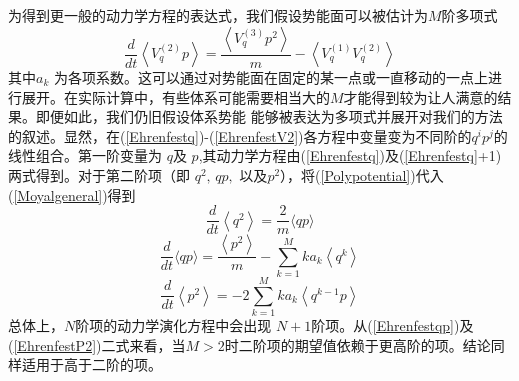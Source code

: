 为得到更一般的动力学方程的表达式，我们假设势能面可以被估计为$M$阶多项式
\begin{equation}
	\frac{d}{d t}\left\langle V_{q}^{(2)} p\right\rangle=\frac{\left\langle V_{q}^{(3)} p^{2}\right\rangle}{m}-\left\langle V_{q}^{(1)} V_{q}^{(2)}\right\rangle
\label{Polypotential} 
\end{equation}
其中$a_k$ 为各项系数。这可以通过对势能面在固定的某一点或一直移动的一点上进行展开。在实际计算中，有些体系可能需要相当大的$M$才能得到较为让人满意的结果。即便如此，我们仍旧假设体系势能 能够被表达为多项式并展开对我们的方法的叙述。显然，在(\ref{Ehrenfestq})-(\ref{EhrenfestV2})各方程中变量变为不同阶的$q^ip^j$的线性组合。第一阶变量为 $q$及 $p$,其动力学方程由(\ref{Ehrenfestq})及(\ref{Ehrenfestq}+1)两式得到。对于第二阶项（即 $q^2,\,qp,$ 以及$p^2$），将(\ref{Polypotential})代入(\ref{Moyalgeneral})得到
\begin{equation}
\frac{d}{d t}\left\langle q^{2}\right\rangle=\frac{2}{m}\langle q p\rangle
\end{equation}
\begin{equation}
	\frac{d}{d t}\langle q p\rangle=\frac{\left\langle p^{2}\right\rangle}{m}-\sum_{k=1}^{M} k a_{k}\left\langle q^{k}\right\rangle
	\label{Ehrenfestqp}
\end{equation}
\begin{equation}
	\frac{d}{d t}\left\langle p^{2}\right\rangle=- 2 \sum_{k=1}^{M} k a_{k}\left\langle q^{k-1} p\right\rangle
	\label{EhrenfestP2}
\end{equation}
总体上，$N$阶项的动力学演化方程中会出现 $N+1$阶项。从(\ref{Ehrenfestqp})及(\ref{EhrenfestP2})二式来看，当$M>2$时二阶项的期望值依赖于更高阶的项。结论同样适用于高于二阶的项。

